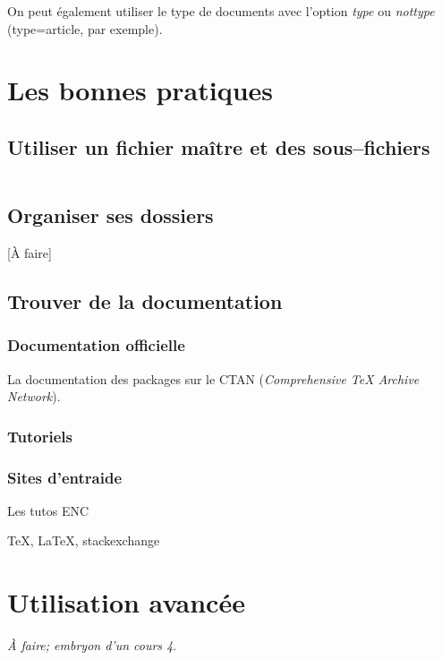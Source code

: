 \documentclass[a4paper,twoside,french,12pt]{book}
\begin{document}
On peut également utiliser le type de documents avec l'option \textit{type} ou \textit{nottype} (type=article, par exemple).

\printbibliography[title=Ouvrages cités en note,prenote=Introbiblio]

\section{Les bonnes pratiques}

\subsection{Utiliser un fichier maître et des sous--fichiers}



\begin{verbatim}

\end{verbatim}

\subsection{Organiser ses dossiers}

[À faire]

\subsection{Trouver de la documentation}

\subsubsection{Documentation officielle}
La documentation des packages sur le CTAN (\textit{Comprehensive TeX Archive Network}).

\subsubsection{Tutoriels}

\subsubsection{Sites d'entraide}

Les tutos ENC

TeX, LaTeX, stackexchange

\section{Utilisation avancée}
\emph{À faire; embryon d'un cours 4}.
\end{document}
